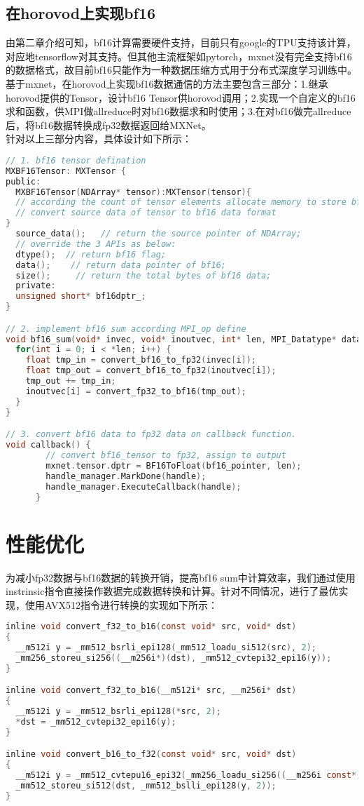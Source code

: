\subsection{在horovod上实现bf16}
由第二章介绍可知，bf16计算需要硬件支持，目前只有google的TPU支持该计算，对应地tensorflow对其支持。但其他主流框架如pytorch，mxnet没有完全支持bf16的数据格式，故目前bf16只能作为一种数据压缩方式用于分布式深度学习训练中。基于mxnet，在horovod上实现bf16数据通信的方法主要包含三部分：1.继承horovod提供的Tensor，设计bf16 Tensor供horovod调用；2.实现一个自定义的bf16求和函数，供MPI做allreduce时对bf16数据求和时使用；3.在对bf16做完allreduce后，将bf16数据转换成fp32数据返回给MXNet。\\
针对以上三部分内容，具体设计如下所示：
\begin{lstlisting}[language=C, numbers=none]
// 1. bf16 tensor defination
MXBF16Tensor: MXTensor {
public:
  MXBF16Tensor(NDArray* tensor):MXTensor(tensor){
  // according the count of tensor elements allocate memory to store bf16 data;
  // convert source data of tensor to bf16 data format
}
  source_data();   // return the source pointer of NDArray;
  // override the 3 APIs as below:
  dtype();  // return bf16 flag;
  data();    // return data pointer of bf16;
  size();     // return the total bytes of bf16 data;
  private:
  unsigned short* bf16dptr_;
}

// 2. implement bf16 sum according MPI_op define
void bf16_sum(void* invec, void* inoutvec, int* len, MPI_Datatype* datatype) {
  for(int i = 0; i < *len; i++) {
    float tmp_in = convert_bf16_to_fp32(invec[i]);
    float tmp_out = convert_bf16_to_fp32(inoutvec[i]);
    tmp_out += tmp_in;
    inoutvec[i] = convert_fp32_to_bf16(tmp_out);
  }
}

// 3. convert bf16 data to fp32 data on callback function.
void callback() {
        // convert bf16_tensor to fp32, assign to output
        mxnet.tensor.dptr = BF16ToFloat(bf16_pointer, len);
        handle_manager.MarkDone(handle);
        handle_manager.ExecuteCallback(handle);
      }
\end{lstlisting}
\section{性能优化}
为减小fp32数据与bf16数据的转换开销，提高bf16 sum中计算效率，我们通过使用instrinsic指令直接操作数据完成数据转换和计算。针对不同情况，进行了最优实现，使用AVX512指令进行转换的实现如下所示：
\begin{lstlisting}[language=C, numbers=none]
inline void convert_f32_to_b16(const void* src, void* dst)
{
  __m512i y = _mm512_bsrli_epi128(_mm512_loadu_si512(src), 2);
  _mm256_storeu_si256((__m256i*)(dst), _mm512_cvtepi32_epi16(y));
}

inline void convert_f32_to_b16(__m512i* src, __m256i* dst)
{
  __m512i y = _mm512_bsrli_epi128(*src, 2);
  *dst = _mm512_cvtepi32_epi16(y);
}

inline void convert_b16_to_f32(const void* src, void* dst)
{
  __m512i y = _mm512_cvtepu16_epi32(_mm256_loadu_si256((__m256i const*)src));
  _mm512_storeu_si512(dst, _mm512_bslli_epi128(y, 2));
}
\end{lstlisting}
